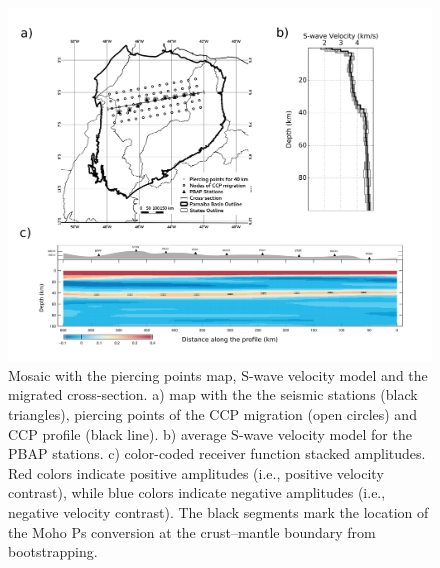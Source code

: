 \documentclass[paper,11pt]{geophysics}
\begin{document}
\pagebreak
\begin{figure}[!ht]
\begin{center}
\includegraphics[width=\textwidth]{Fig/section_migration.png}
\caption{Mosaic with the piercing points map, S-wave velocity model and the migrated cross-section. a) map with the the seismic stations (black triangles), piercing points of the CCP migration (open circles) and CCP profile (black line). b) average S-wave velocity model for the PBAP stations. c) color-coded receiver function stacked amplitudes. Red colors indicate positive amplitudes (i.e., positive velocity contrast), while blue colors indicate negative amplitudes (i.e., negative velocity contrast). The black segments mark the location of the Moho Ps conversion at the crust–mantle boundary from bootstrapping.}
\label{moisaic_migration}
\end{center}
\end{figure}
 
\pagebreak
\end{document}
